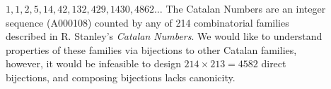 \documentclass[final]{beamer}
\newlength{\sepwidth}
\newlength{\colwidth}
\newcommand{\separatorcolumn}{\begin{column}{\sepwidth}\end{column}}
\begin{document}
\begin{frame}[t]
\begin{columns}[t]
\begin{column}{\colwidth}










\end{column}

\separatorcolumn

\begin{column}{\colwidth}

  \begin{block}{$1, 1, 2, 5, 14, 42, 132, 429, 1430, 4862\dots$}
    The Catalan Numbers are an integer sequence (A000108) counted by any of 214 combinatorial families described in R. Stanley's \textit{Catalan Numbers}. We would like to understand properties of these families via bijections to other Catalan families, however, it would be infeasible to design $214 \times 213 = 4582$ direct bijections, and composing bijections lacks canonicity.


\end{block}
\end{column}
\end{columns}
\end{frame}
\end{document}
